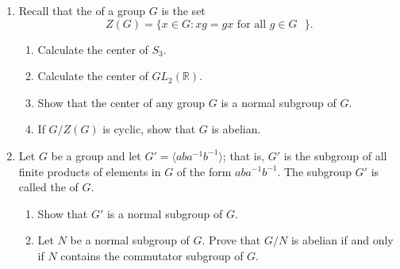 {\begin{enumerate}
 
\item
Recall that the  of a group $G$ is
the set 
\[
Z(G) = \{ x \in G : xg = gx \mbox{ for all $g \in G$ } \}.
\]
\begin{enumerate}
 
 \item
Calculate the center of $S_3$.
 
 \item
Calculate the center of $GL_2 ( {\mathbb R} )$.
 
 \item
Show that the center of any group $G$ is a normal subgroup of $G$. 
 
 \item
If $G / Z(G)$ is cyclic, show that $G$ is abelian.
 
\end{enumerate}
 
 
 
 
\item
Let $G$ be a group and let $G' = \langle aba^{- 1} b^{-1} \rangle$;
that is, $G'$ is the subgroup of all finite products of elements in
$G$ of the form $aba^{-1}b^{-1}$.  The subgroup $G'$ is called the
\label{commutatorsubgroup} of $G$.  
\begin{enumerate}
 
 \item
Show that $G'$ is a normal subgroup of $G$.

 \item
Let $N$ be  a normal subgroup of $G$.  Prove that $G/N$ is abelian if
and only if $N$ contains the commutator subgroup of $G$.
 
\end{enumerate}

 
% 
% 
% 
% 
% 
% 
% 


\end{enumerate}
}
 


